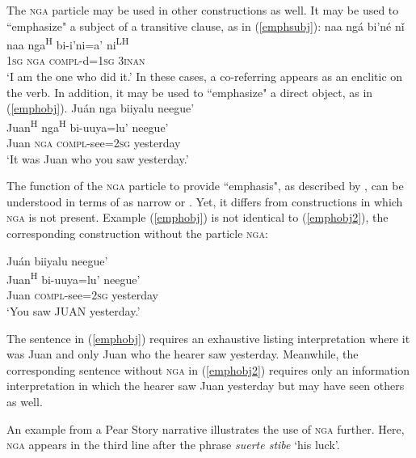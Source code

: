 The \textsc{nga} particle may be used in other constructions as well. It may be used to ``emphasize" a subject of a transitive clause, as in (\ref{emphsubj}):
\ea\label{emphsubj}
\glll naa ng\'{a} bi'n\'{e} n\v{i} \\
naa nga\textsuperscript{H} bi-i'ni=a' ni\textsuperscript{LH} \\
1\textsc{sg} \textsc{nga} \textsc{compl}-d=1\textsc{sg} 3\textsc{inan} \\
\glt `I am the one who did it.' \hfill \citep[98]{pickett1998}
\z
In these cases, a co-referring  appears as an enclitic on the verb. In addition, it may  be used to ``emphasize" a direct object, as in (\ref{emphobj}).
\ea\label{emphobj} 
\glll Ju\'{a}n nga biiyalu neegue' \\
Juan\textsuperscript{H} nga\textsuperscript{H} bi-uuya=lu' neegue' \\
Juan \textsc{nga} \textsc{compl}-see=2\textsc{sg} yesterday \\
\glt `It was Juan who you saw yesterday.' \hfill \citep[98]{pickett1998}

\z
The function of the \textsc{nga} particle to provide ``emphasis", as described by \citet{pickett1998}, can be understood in terms of \citet{lambrecht1994} as narrow or . Yet, it differs from  constructions in which \textsc{nga} is not present. Example (\ref{emphobj}) is not identical to (\ref{emphobj2}), the corresponding  construction without the particle \textsc{nga}:

\ea\label{emphobj2}
\glll Ju\'{a}n biiyalu neegue' \\
Juan\textsuperscript{H} bi-uuya=lu' neegue' \\
Juan \textsc{compl}-see=2\textsc{sg} yesterday \\
\glt `You saw JUAN yesterday.'

\z
The sentence in (\ref{emphobj}) requires an exhaustive listing interpretation where it was Juan and only Juan who the hearer saw yesterday. Meanwhile, the corresponding sentence without \textsc{nga} in (\ref{emphobj2}) requires only an information  interpretation in which the hearer saw Juan yesterday but may have seen others as well.


An example from a Pear Story narrative illustrates the use of \textsc{nga} further. Here, \textsc{nga} appears in the third line after the phrase \textit{suerte stibe} `his luck'.

